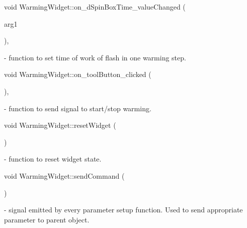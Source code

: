 {\setlength{\rightskip}{0pt plus 5cm}void Warming\+Widget\+::{\texorpdfstring{on\+\_\+d\+Spin\+Box\+Time\+\_\+value\+Changed}{on_dSpinBoxTime_valueChanged}} (
\begin{DoxyParamCaption}
\item[{double}]{arg1}
\end{DoxyParamCaption}
)\hspace{0.3cm}{\ttfamily [private]}, {\ttfamily [slot]}}\hypertarget{classWarmingWidget_a26b06ccfb9f84215772231e40d2bbb4b}{}\label{classWarmingWidget_a26b06ccfb9f84215772231e40d2bbb4b} - function to set time of work of flash in one warming step.


{\setlength{\rightskip}{0pt plus 5cm}void Warming\+Widget\+::{\texorpdfstring{on\+\_\+tool\+Button\+\_\+clicked}{on_toolButton_clicked}} (
\begin{DoxyParamCaption}
{}
\end{DoxyParamCaption}
)\hspace{0.3cm}{\ttfamily [private]}, {\ttfamily [slot]}}\hypertarget{classWarmingWidget_af6d7762dac4bb124e1ba6ba9ea86bbeb}{}\label{classWarmingWidget_af6d7762dac4bb124e1ba6ba9ea86bbeb} - function to send signal to start/stop warming.


{\setlength{\rightskip}{0pt plus 5cm}void Warming\+Widget\+::{\texorpdfstring{reset\+Widget}{resetWidget}} (
\begin{DoxyParamCaption}
{}
\end{DoxyParamCaption}
)}\hypertarget{classWarmingWidget_a4aa925700a3d51f16d1c61dcd447d503}{}\label{classWarmingWidget_a4aa925700a3d51f16d1c61dcd447d503} - function to reset widget state.


{\setlength{\rightskip}{0pt plus 5cm}void Warming\+Widget\+::{\texorpdfstring{send\+Command}{sendCommand}} (
\begin{DoxyParamCaption}
\item[{Q\+Byte\+Array}]{}
\end{DoxyParamCaption}
)\hspace{0.3cm}{\ttfamily [signal]}}\hypertarget{classWarmingWidget_ab18f4c153590131b6f391b084a4351f4}{}\label{classWarmingWidget_ab18f4c153590131b6f391b084a4351f4} - signal emitted by every parameter setup function. Used to send appropriate parameter to parent object.



